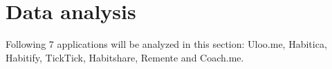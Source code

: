 
\section{Data analysis}\label{sec:data-analysis}

Following 7 applications will be analyzed in this section: Uloo.me, Habitica, Habitify, TickTick, Habitshare, Remente and Coach.me.
%
%
%


